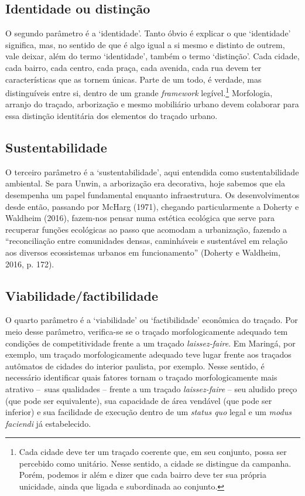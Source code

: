 \documentclass[12pt, a4paper]{book} %
\begin{document}
                \subsection*{Identidade ou distinção}
        
        O segundo parâmetro é a `identidade'. Tanto óbvio é explicar o que `identidade' significa, mas, no sentido de que é algo igual a si mesmo e distinto de outrem, vale deixar, além do termo `identidade', também o termo `distinção'. Cada cidade, cada bairro, cada centro, cada praça, cada avenida, cada rua devem ter características que as tornem únicas. Parte de um todo, é verdade, mas distinguíveis entre si, dentro de um grande \textit{framework} legível.\footnote[106]{Cada cidade deve ter um traçado coerente que, em seu conjunto, possa ser percebido como unitário. Nesse sentido, a cidade se distingue da campanha. Porém, podemos ir além e dizer que cada bairro deve ter sua própria unicidade, ainda que ligada e subordinada ao conjunto.} Morfologia, arranjo do traçado, arborização e mesmo mobiliário urbano devem colaborar para essa distinção identitária dos elementos do traçado urbano.

                \subsection*{Sustentabilidade}

        O terceiro parâmetro é a `sustentabilidade', aqui entendida como sustentabilidade ambiental. Se para Unwin, a arborização era decorativa, hoje sabemos que ela desempenha um papel fundamental enquanto infraestrutura. Os desenvolvimentos desde então, passando por McHarg (1971), chegando particularmente a Doherty e Waldheim (2016), fazem-nos pensar numa estética ecológica que serve para recuperar funções ecológicas ao passo que acomodam a urbanização, fazendo a ``reconciliação entre comunidades densas, caminháveis e sustentável em relação aos diversos ecossistemas urbanos em funcionamento'' (Doherty e Waldheim, 2016, p. 172).

                \subsection*{Viabilidade/factibilidade}

        O quarto parâmetro é a `viabilidade' ou `factibilidade' econômica do traçado. Por meio desse parâmetro, verifica-se se o traçado morfologicamente adequado tem condições de competitividade frente a um traçado \textit{laissez-faire}. Em Maringá, por exemplo, um traçado morfologicamente adequado teve lugar frente aos traçados autômatos de cidades do interior paulista, por exemplo. Nesse sentido, é necessário identificar quais fatores tornam o traçado morfologicamente mais atrativo – suas qualidades – frente a um traçado \textit{laissez-faire} – seu aludido preço (que pode ser equivalente), sua capacidade de área vendável (que pode ser inferior) e sua facilidade de execução dentro de um \textit{status quo} legal e um \textit{modus faciendi} já estabelecido.
\end{document}
